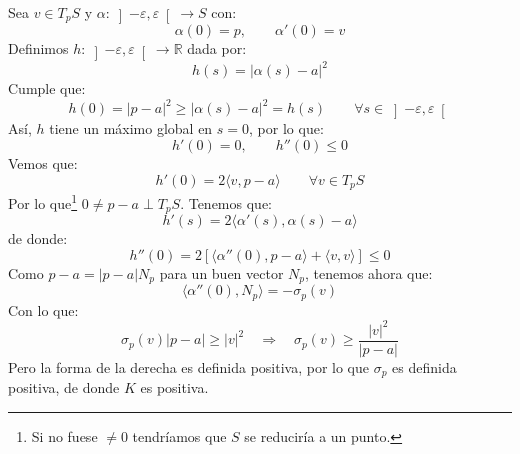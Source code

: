 \begin{ejercicio}
    \noindent
    Sea $v\in T_pS$ y $\alpha:\left]-\varepsilon,\varepsilon\right[\to S$ con: 
    \begin{equation*}
        \alpha(0) = p,\qquad \alpha'(0) = v
    \end{equation*}
    Definimos $h:\left]-\varepsilon,\varepsilon\right[\to \mathbb{R}$ dada por:
    \begin{equation*}
        h(s) = |\alpha(s)-a|^2
    \end{equation*}
    Cumple que:
    \begin{equation*}
        h(0) = |p-a|^2 \geq |\alpha(s)-a|^2 = h(s) \qquad \forall s\in \left]-\varepsilon,\varepsilon\right[
    \end{equation*}
    Así, $h$  tiene un máximo global en $s=0$, por lo que: 
    \begin{equation*}
        h'(0) = 0, \qquad h''(0) \leq 0
    \end{equation*}
    Vemos que:
    \begin{equation*}
        h'(0) = 2\langle v,p-a \rangle \qquad \forall v\in T_pS
    \end{equation*}
    Por lo que\footnote{Si no fuese $\neq 0$ tendríamos que $S$ se reduciría a un punto.} $0\neq p-a\perp T_pS$. Tenemos que:
    \begin{equation*}
        h'(s) = 2\langle \alpha'(s),\alpha(s)-a \rangle 
    \end{equation*}
    de donde:
    \begin{equation*}
        h''(0) = 2\left[\langle \alpha''(0), p-a \rangle  + \langle v,v \rangle \right] \leq 0
    \end{equation*}
    Como $p-a = |p-a|N_p$ para un buen vector $N_p$, tenemos ahora que:
    \begin{equation*}
        \langle \alpha''(0),N_p \rangle  = -\sigma_p(v)
    \end{equation*}
    Con lo que:
    \begin{equation*}
        \sigma_p(v)|p-a| \geq |v|^2 \quad\Longrightarrow\quad \sigma_p(v) \geq \frac{|v|^2}{|p-a|}
    \end{equation*}
    Pero la forma de la derecha es definida positiva, por lo que $\sigma_p$ es definida positiva, de donde $K$ es positiva.
\end{ejercicio}

